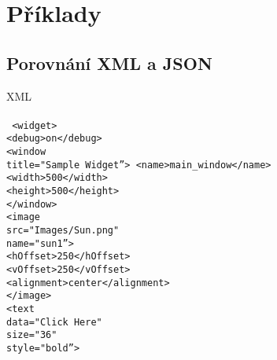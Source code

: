 \chapter{Příklady}
\label{prilohaa}

\section{Porovnání XML a JSON}
\label{prilohaPorovnaniXmlJson}
\begin{minipage}{0.5\textwidth}
{\Large XML}\\\\
\texttt{\small
<widget>\\
\hspace*{2mm}<debug>on</debug>\\
\hspace*{2mm}<window\\
\hspace*{4mm}title="Sample Widget\textquotedblright>
\hspace*{4mm}<name>main\_window</name>\\
\hspace*{4mm}<width>500</width>\\
\hspace*{4mm}<height>500</height>\\
\hspace*{2mm}</window>\\
\hspace*{2mm}<image\\
\hspace*{4mm}src="Images/Sun.png"\\
\hspace*{4mm}name="sun1\textquotedblright>\\
\hspace*{4mm}<hOffset>250</hOffset>\\
\hspace*{4mm}<vOffset>250</vOffset>\\
\hspace*{4mm}<alignment>center</alignment>\\
\hspace*{2mm}</image>\\
\hspace*{2mm}<text\\
\hspace*{4mm}data="Click Here"\\
\hspace*{4mm}size="36"\\
\hspace*{4mm}style="bold\textquotedblright>\\
}
\end{minipage}
